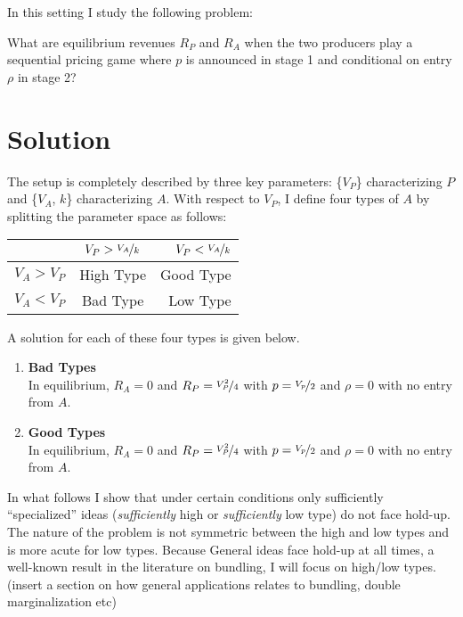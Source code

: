 \documentclass[12pt]{article}
\begin{document}
In this setting I study the following problem:

What are equilibrium revenues $R_P$ and $R_A$ when the two producers play a sequential
pricing game where $p$ is announced in stage 1 and
conditional on entry $\rho$ in stage 2? 



\section{Solution}

The setup is completely described by three key parameters: \{$V_P$\}
characterizing $P$ and \{$V_A$, $k$\} characterizing $A$. 
With respect to $V_P$, I define four types of $A$ by splitting the
parameter space as follows:
\begin{center}

\begin{tabular}{ | l | c  r |}

\hline 

             & $V_P>\nicefrac{V_A}{k}$ & $V_P<\nicefrac{V_A}{k}$ \\ \hline
  $V_A>V_P$  & High Type & Good Type \\ 
   $V_A<V_P$ & Bad Type & Low Type \\ 
\hline
\end{tabular}

\end{center}


A solution for each of these four types is given below. 

\begin{enumerate}

\item \textbf{Bad Types} \\
In equilibrium, $R_A=0$ and $R_P=\nicefrac{V_P^2}{4}$
with $p=\nicefrac{V_p}{2}$ and $\rho=0$ with no entry from $A$.

\item \textbf{Good Types} \\
In equilibrium, $R_A=0$ and $R_P=\nicefrac{V_P^2}{4}$
with $p=\nicefrac{V_p}{2}$ and $\rho=0$ with no entry from $A$.



\end{enumerate}






In what follows I show that under certain conditions only
sufficiently ``specialized'' ideas (\emph{sufficiently} high or \emph{sufficiently}
low type) do not face hold-up. The nature of the problem is
not symmetric between the high and low types and is more acute for
low types. Because General ideas face hold-up at all times, a
well-known result in the literature on bundling, I will focus on
high/low types.  (insert a section on how general applications relates
to bundling, double marginalization etc)
\end{document}

